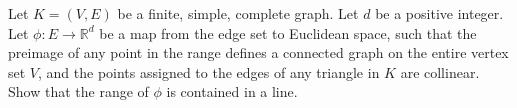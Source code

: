 Let $K=(V,E)$ be a finite, simple, complete graph. Let $d$ be a positive integer. Let $\phi:E\to \mathbb{R}^d$ be a map from the edge set to Euclidean space, such that the preimage of any point in the range defines a connected graph on the entire vertex set $V$, and the points assigned to the edges of any triangle in $K$ are collinear. Show that the range of $\phi$ is contained in a line.